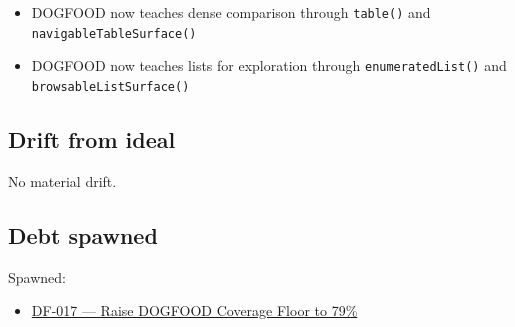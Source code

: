 \begin{itemize}
\tightlist
\item
  DOGFOOD now teaches dense comparison through \texttt{t\allowbreak{}a\allowbreak{}b\allowbreak{}l\allowbreak{}e\allowbreak{}(\allowbreak{})} and \texttt{n\allowbreak{}a\allowbreak{}v\allowbreak{}i\allowbreak{}g\allowbreak{}a\allowbreak{}b\allowbreak{}l\allowbreak{}e\allowbreak{}T\allowbreak{}a\allowbreak{}b\allowbreak{}l\allowbreak{}e\allowbreak{}S\allowbreak{}u\allowbreak{}r\allowbreak{}f\allowbreak{}a\allowbreak{}c\allowbreak{}e\allowbreak{}(\allowbreak{})}
\item
  DOGFOOD now teaches lists for exploration through \texttt{e\allowbreak{}n\allowbreak{}u\allowbreak{}m\allowbreak{}e\allowbreak{}r\allowbreak{}a\allowbreak{}t\allowbreak{}e\allowbreak{}d\allowbreak{}L\allowbreak{}i\allowbreak{}s\allowbreak{}t\allowbreak{}(\allowbreak{})} and \texttt{b\allowbreak{}r\allowbreak{}o\allowbreak{}w\allowbreak{}s\allowbreak{}a\allowbreak{}b\allowbreak{}l\allowbreak{}e\allowbreak{}L\allowbreak{}i\allowbreak{}s\allowbreak{}t\allowbreak{}S\allowbreak{}u\allowbreak{}r\allowbreak{}f\allowbreak{}a\allowbreak{}c\allowbreak{}e\allowbreak{}(\allowbreak{})}
\end{itemize}

\subsection{Drift from ideal}\label{record-078-drift-from-ideal}

No material drift.

\subsection{Debt spawned}\label{record-078-debt-spawned}

Spawned:

\begin{itemize}
\tightlist
\item
  \href{https://github.com/flyingrobots/bijou/blob/cbd70612140e7a450d764b3c7be1c6af878b99bc/docs/design/DF-017-raise-dogfood-coverage-floor-to-79-percent.md}{DF-017 --- Raise DOGFOOD Coverage Floor to 79\%}
\end{itemize}

